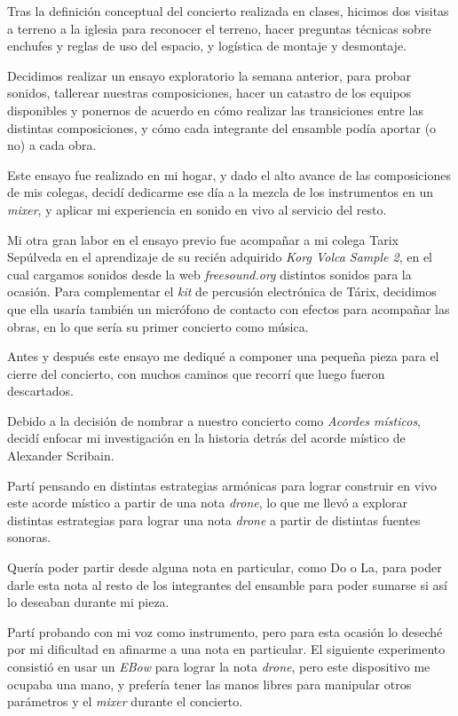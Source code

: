\documentclass{article}
\begin{document}
Tras la definición conceptual del concierto realizada en clases, hicimos dos visitas a terreno a la iglesia para reconocer el terreno, hacer preguntas técnicas sobre enchufes y reglas de uso del espacio, y logística de montaje y desmontaje.

Decidimos realizar un ensayo exploratorio la semana anterior, para probar sonidos, tallerear nuestras composiciones, hacer un catastro de los equipos disponibles y ponernos de acuerdo en cómo realizar las transiciones entre las distintas composiciones, y cómo cada integrante del ensamble podía aportar (o no) a cada obra.

Este ensayo fue realizado en mi hogar, y dado el alto avance de las composiciones de mis colegas, decidí dedicarme ese día a la mezcla de los instrumentos en un \textit{mixer}, y aplicar mi experiencia en sonido en vivo al servicio del resto.

Mi otra gran labor en el ensayo previo fue acompañar a mi colega Tarix Sepúlveda en el aprendizaje de su recién adquirido \textit{Korg Volca Sample 2}, en el cual cargamos sonidos desde la web \textit{freesound.org} distintos sonidos para la ocasión. Para complementar el \textit{kit} de percusión electrónica de Tárix, decidimos que ella usaría también un micrófono de contacto con efectos para acompañar las obras, en lo que sería su primer concierto como música.

Antes y después este ensayo me dediqué a componer una pequeña pieza para el cierre del concierto, con muchos caminos que recorrí que luego fueron descartados.

Debido a la decisión de nombrar a nuestro concierto como \textit{Acordes místicos}, decidí enfocar mi investigación en la historia detrás del acorde místico de Alexander Scribain.

Partí pensando en distintas estrategias armónicas para lograr construir en vivo este acorde místico a partir de una nota \textit{drone}, lo que me llevó a explorar distintas estrategias para lograr una nota \textit{drone} a partir de distintas fuentes sonoras.

Quería poder partir desde alguna nota en particular, como Do o La, para poder darle esta nota al resto de los integrantes del ensamble para poder sumarse si así lo deseaban durante mi pieza.

Partí probando con mi voz como instrumento, pero para esta ocasión lo deseché por mi dificultad en afinarme a una nota en particular. El siguiente experimento consistió en usar un \textit{EBow} \cite{EBow} para lograr la nota \textit{drone}, pero este dispositivo me ocupaba una mano, y prefería tener las manos libres para manipular otros parámetros y el \textit{mixer} durante el concierto.
\end{document}
